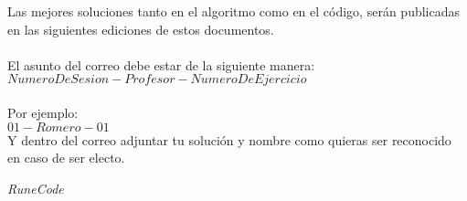 \documentclass{article}
\begin{document}
Las mejores soluciones tanto en el algoritmo como en el código, serán publicadas en las siguientes ediciones de estos documentos.\\ \\

El asunto del correo debe estar de la siguiente manera:\\
$NumeroDeSesion-Profesor-NumeroDeEjercicio$ \\ \\
Por ejemplo:  \\
$01-Romero-01$ \\

Y dentro del correo adjuntar tu solución y nombre como quieras ser reconocido en caso de ser electo.

\vspace{2cm}
\LARGE\textit{RuneCode}
\end{document}

